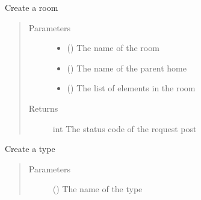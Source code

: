 \documentclass[letterpaper,10pt,english]{sphinxmanual}
\begin{document}
\begin{fulllineitems}

\begin{fulllineitems}
\label{\detokenize{index:Api.Api.create_room}}
\sphinxAtStartPar
Create a room
\begin{quote}\begin{description}
\item[{Parameters}] \leavevmode\begin{itemize}
\item {} 
\sphinxAtStartPar
{} () \textendash{} The name of the room

\item {} 
\sphinxAtStartPar
{} () \textendash{} The name of the parent home

\item {} 
\sphinxAtStartPar
{} () \textendash{} The list of elements in the room

\end{itemize}

\item[{Returns}] \leavevmode
\sphinxAtStartPar
int \textendash{} The status code of the request post

\end{description}\end{quote}

\end{fulllineitems}


\begin{fulllineitems}
\label{\detokenize{index:Api.Api.create_type}}
\sphinxAtStartPar
Create a type
\begin{quote}\begin{description}
\item[{Parameters}] \leavevmode
\sphinxAtStartPar
{} () \textendash{} The name of the type


\end{description}
\end{quote}
\end{fulllineitems}
\end{fulllineitems}
\end{document}
